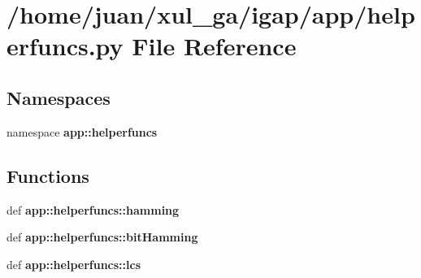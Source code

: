 \section{/home/juan/xul\_\-ga/igap/app/helperfuncs.py File Reference}
\label{helperfuncs_8py}
\subsection*{Namespaces}
\begin{CompactItemize}
\item 
namespace {\bf app::helperfuncs}
\end{CompactItemize}
\subsection*{Functions}
\begin{CompactItemize}
\item 
def {\bf app::helperfuncs::hamming}
\item 
def {\bf app::helperfuncs::bitHamming}
\item 
def {\bf app::helperfuncs::lcs}
\end{CompactItemize}
